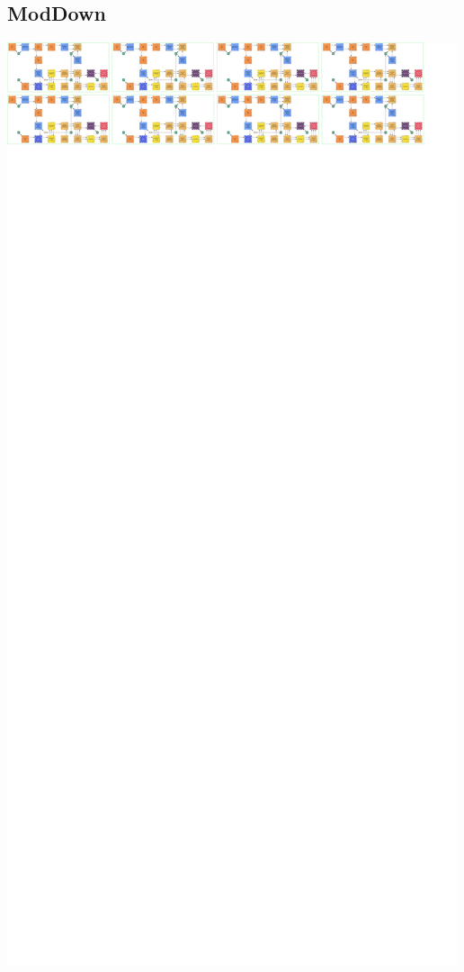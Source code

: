 \documentclass[../../fheimpl.tex]{subfiles}
\begin{document}
\subsection{ModDown}
\includegraphics[width=\textwidth,height=\textheight,keepaspectratio]{graphics/moddown.png}


\ifimplismain
\else
\printbibliography
\fi
\end{document}
